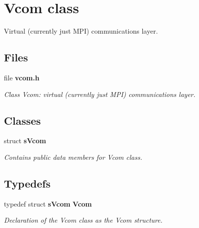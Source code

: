 \section{Vcom class}
\label{a00024}


Virtual (currently just M\+P\+I) communications layer.  


\subsection*{Files}
\begin{DoxyCompactItemize}
\item 
file {\bf vcom.\+h}
\begin{DoxyCompactList}\small\item\em Class Vcom\+: virtual (currently just M\+P\+I) communications layer. \end{DoxyCompactList}\end{DoxyCompactItemize}
\subsection*{Classes}
\begin{DoxyCompactItemize}
\item 
struct {\bf s\+Vcom}
\begin{DoxyCompactList}\small\item\em Contains public data members for Vcom class. \end{DoxyCompactList}\end{DoxyCompactItemize}
\subsection*{Typedefs}
\begin{DoxyCompactItemize}
\item 
typedef struct {\bf s\+Vcom} {\bf Vcom}
\begin{DoxyCompactList}\small\item\em Declaration of the Vcom class as the Vcom structure. \end{DoxyCompactList}\end{DoxyCompactItemize}
